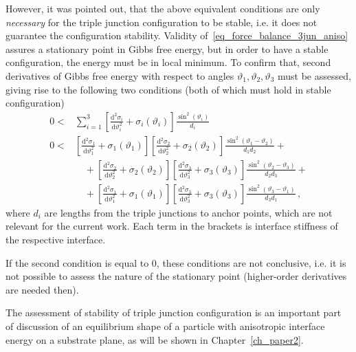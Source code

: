 However, it was pointed out, that the above equivalent conditions are only \textit{necessary} for the triple junction configuration to be stable, i.e. it does not guarantee the configuration stability. Validity of~\eqref{eq_force_balance_3jun_aniso} assures a stationary point in Gibbs free energy, but in order to have a stable configuration, the energy must be in local minimum. To confirm that, second derivatives of Gibbs free energy with respect to angles $\vartheta_1,\vartheta_2,\vartheta_3$ must be assessed, giving rise to the following two conditions (both of which must hold in stable configuration)
\begin{align} \label{eq_3jun_aniso_stabcond1}
    0 <& \sum_{i=1}^3 \left[ \frac{\mathrm{d}^2 \sigma_i}{\mathrm{d} \vartheta_i^2} + \sigma_i(\vartheta_i) \right]\frac{\sin^2(\vartheta_i)}{d_i} \\  \label{eq_3jun_aniso_stabcond2}
    0 <& \left[ \frac{\mathrm{d}^2 \sigma_1}{\mathrm{d} \vartheta_1^2} + \sigma_1(\vartheta_1) \right]\left[ \frac{\mathrm{d}^2 \sigma_2}{\mathrm{d} \vartheta_2^2} + \sigma_2(\vartheta_2) \right] \frac{\sin^2(\vartheta_1-\vartheta_2)}{d_1d_2} +    \\
     &\quad +\left[ \frac{\mathrm{d}^2 \sigma_2}{\mathrm{d} \vartheta_2^2} + \sigma_2(\vartheta_2) \right]\left[ \frac{\mathrm{d}^2 \sigma_3}{\mathrm{d} \vartheta_3^2} +  \sigma_3(\vartheta_3) \right] \frac{\sin^2(\vartheta_2-\vartheta_3)}{d_2d_3} + \nonumber \\
     &\quad + \left[ \frac{\mathrm{d}^2 \sigma_1}{\mathrm{d} \vartheta_1^2} + \sigma_1(\vartheta_1) \right]\left[ \frac{\mathrm{d}^2 \sigma_3}{\mathrm{d} \vartheta_3^2} + \sigma_3(\vartheta_3) \right]  \frac{\sin^2(\vartheta_3-\vartheta_1)}{d_3d_1} \nonumber \,,
\end{align}
where $d_i$ are lengths from the triple junctions to anchor points, which are not relevant for the current work. Each term in the brackets is interface stiffness of the respective interface.

If the second condition is equal to 0, these conditions are not conclusive, i.e. it is not possible to assess the nature of the stationary point (higher-order derivatives are needed then). 

The assessment of stability of triple junction configuration is an important part of discussion of an equilibrium shape of a particle with anisotropic interface energy on a substrate plane, as will be shown in Chapter~\ref{ch_paper2}.

